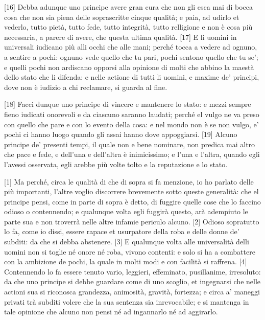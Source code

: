 {[}16{]} Debba adunque uno principe avere gran cura che non gli esca mai
di bocca cosa che non sia piena delle soprascritte cinque qualità; e
paia, ad udirlo et vederlo, tutto pietà, tutto fede, tutto integrità,
tutto relligione e non è cosa più necessaria, a parere di avere, che
questa ultima qualità. {[}17{]} E li uomini in universali iudicano più
alli occhi che alle mani; perché tocca a vedere ad ognuno, a sentire a
pochi: ognuno vede quello che tu pari, pochi sentono quello che tu se';
e quelli pochi non ardiscano opporsi alla opinione di molti che abbino
la maestà dello stato che li difenda: e nelle actione di tutti li
uomini, e maxime de' principi, dove non è iudizio a chi reclamare, si
guarda al fine.

{[}18{]} Facci dunque uno principe di vincere e mantenere lo stato: e
mezzi sempre fieno iudicati onorevoli e da ciascuno saranno laudati;
perché el vulgo ne va preso con quello che pare e con lo evento della
cosa: e nel mondo non è se non vulgo, e' pochi ci hanno luogo quando gli
assai hanno dove appoggiarsi. {[}19{]} Alcuno principe de' presenti
tempi, il quale non e bene nominare, non predica mai altro che pace e
fede, e dell'una e dell'altra è inimicissimo; e l'una e l'altra, quando
egli l'avessi osservata, egli arebbe più volte tolto e la reputazione e
lo stato.


{[}1{]} Ma perché, circa le qualità di che di sopra si fa menzione, io
ho parlato delle più importanti, l'altre voglio discorrere brevemente
sotto queste generalità: che el principe pensi, come in parte di sopra è
detto, di fuggire quelle cose che lo faccino odioso o contennendo; e
qualunque volta egli fuggirà questo, arà adempiuto le parte sua e non
troverrà nelle altre infamie periculo alcuno. {[}2{]} Odioso sopratutto
lo fa, come io dissi, essere rapace et usurpatore della roba e delle
donne de' subditi: da che si debba abstenere. {[}3{]} E qualunque volta
alle universalità delli uomini non si toglie né onore né roba, vivono
contenti: e solo si ha a combattere con la ambizione de pochi, la quale
in molti modi e con facilità si raffrena. {[}4{]} Contennendo lo fa
essere tenuto vario, leggieri, effeminato, pusillanime, irresoluto: da
che uno principe si debbe guardare come di uno scoglio, et ingegnarsi
che nelle actioni sua si riconosca grandezza, animosità, gravità,
fortezza; e circa a' maneggi privati trà subditi volere che la sua
sentenza sia inrevocabile; e si mantenga in tale opinione che alcuno non
pensi né ad ingannarlo né ad aggirarlo.

